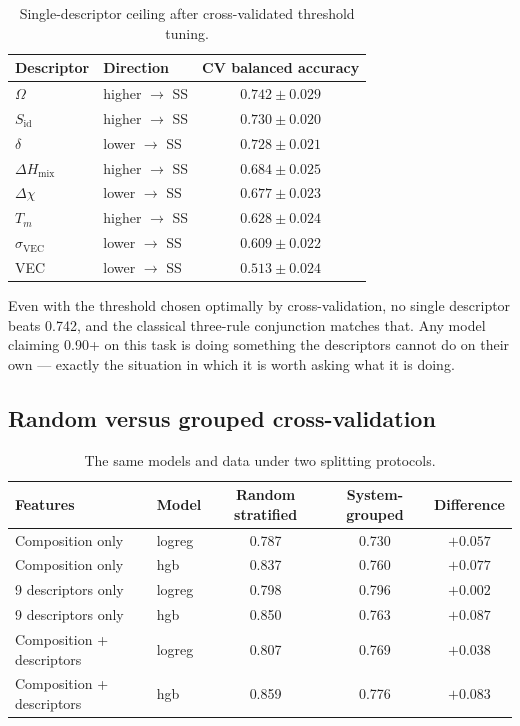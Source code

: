 \documentclass[11pt]{article}
\begin{document}
\begin{table}[t]
\centering
\caption{Single-descriptor ceiling after cross-validated threshold tuning.}
\label{tab:single}
\begin{tabular}{llc}
\toprule
Descriptor & Direction & CV balanced accuracy \\
\midrule
$\Omega$      & higher $\rightarrow$ SS & $\mathbf{0.742 \pm 0.029}$ \\
$S_{\mathrm{id}}$ & higher $\rightarrow$ SS & $0.730 \pm 0.020$ \\
$\delta$      & lower $\rightarrow$ SS  & $0.728 \pm 0.021$ \\
$\Delta H_{\mathrm{mix}}$ & higher $\rightarrow$ SS & $0.684 \pm 0.025$ \\
$\Delta\chi$  & lower $\rightarrow$ SS  & $0.677 \pm 0.023$ \\
$T_m$         & higher $\rightarrow$ SS & $0.628 \pm 0.024$ \\
$\sigma_{\mathrm{VEC}}$ & lower $\rightarrow$ SS & $0.609 \pm 0.022$ \\
VEC           & lower $\rightarrow$ SS  & $0.513 \pm 0.024$ \\
\bottomrule
\end{tabular}
\end{table}

Even with the threshold chosen optimally by cross-validation, no single descriptor beats 0.742, and the classical three-rule conjunction matches that. Any model claiming 0.90+ on this task is doing something the descriptors cannot do on their own --- exactly the situation in which it is worth asking what it is doing.

\subsection{Random versus grouped cross-validation}

\begin{table}[t]
\centering
\caption{The same models and data under two splitting protocols.}
\label{tab:cv}
\begin{tabular}{llccc}
\toprule
Features & Model & Random stratified & System-grouped & Difference \\
\midrule
Composition only          & logreg & 0.787 & 0.730 & $+0.057$ \\
Composition only          & hgb    & 0.837 & 0.760 & $+0.077$ \\
9 descriptors only        & logreg & 0.798 & 0.796 & $+0.002$ \\
9 descriptors only        & hgb    & 0.850 & 0.763 & $+0.087$ \\
Composition + descriptors & logreg & 0.807 & 0.769 & $+0.038$ \\
Composition + descriptors & hgb    & 0.859 & 0.776 & $+0.083$ \\
\bottomrule
\end{tabular}
\end{table}
\end{document}
